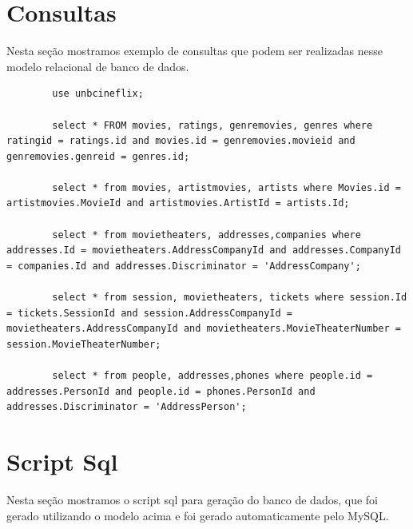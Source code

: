\documentclass[a4paper,10pt]{article}
\begin{document}
\section{Consultas}

Nesta seção mostramos exemplo de consultas que podem ser realizadas nesse modelo relacional de banco de dados.

\begin{lstlisting}
		use unbcineflix;
		
		select * FROM movies, ratings, genremovies, genres where ratingid = ratings.id and movies.id = genremovies.movieid and genremovies.genreid = genres.id;
		
		select * from movies, artistmovies, artists where Movies.id = artistmovies.MovieId and artistmovies.ArtistId = artists.Id;
		
		select * from movietheaters, addresses,companies where addresses.Id = movietheaters.AddressCompanyId and addresses.CompanyId = companies.Id and addresses.Discriminator = 'AddressCompany';
		
		select * from session, movietheaters, tickets where session.Id = tickets.SessionId and session.AddressCompanyId = movietheaters.AddressCompanyId and movietheaters.MovieTheaterNumber = session.MovieTheaterNumber;
		
		select * from people, addresses,phones where people.id = addresses.PersonId and people.id = phones.PersonId and addresses.Discriminator = 'AddressPerson';
\end{lstlisting}

\section{Script Sql}

Nesta seção mostramos o script sql para geração do banco de dados, que foi gerado utilizando o modelo acima e foi gerado automaticamente pelo MySQL.
\end{document}
